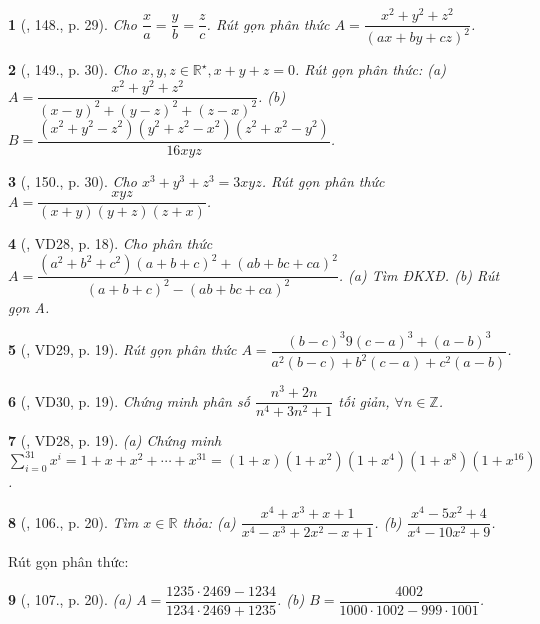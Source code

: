 \documentclass{article}
\newtheorem{baitoan}{}
\begin{document}
\begin{baitoan}[\cite{Tuyen_Toan_8}, 148., p. 29]
	Cho $\dfrac{x}{a} = \dfrac{y}{b} = \dfrac{z}{c}$. Rút gọn phân thức $A = \dfrac{x^2 + y^2 + z^2}{(ax + by + cz)^2}$.
\end{baitoan}

\begin{baitoan}[\cite{Tuyen_Toan_8}, 149., p. 30]
	Cho $x,y,z\in\mathbb{R}^\star,x + y + z = 0$. Rút gọn phân thức: (a) $A = \dfrac{x^2 + y^2 + z^2}{(x - y)^2 + (y - z)^2 + (z - x)^2}$. (b) $B = \dfrac{(x^2 + y^2 - z^2)(y^2 + z^2 - x^2)(z^2 + x^2 - y^2)}{16xyz}$.	
\end{baitoan}

\begin{baitoan}[\cite{Tuyen_Toan_8}, 150., p. 30]
	Cho $x^3 + y^3 + z^3 = 3xyz$. Rút gọn phân thức $A = \dfrac{xyz}{(x + y)(y + z)(z + x)}$.
\end{baitoan}

\begin{baitoan}[\cite{Binh_Toan_8_tap_1}, VD28, p. 18]
	Cho phân thức $A = \dfrac{(a^2 + b^2 + c^2)(a + b + c)^2 + (ab + bc + ca)^2}{(a + b + c)^2 - (ab + bc + ca)^2}$. (a) Tìm {\rm ĐKXĐ}. (b) Rút gọn A.
\end{baitoan}

\begin{baitoan}[\cite{Binh_Toan_8_tap_1}, VD29, p. 19]
	Rút gọn phân thức $A = \dfrac{(b - c)^3 9 (c - a)^3 + (a - b)^3}{a^2(b - c) + b^2(c - a) + c^2(a - b)}$.
\end{baitoan}

\begin{baitoan}[\cite{Binh_Toan_8_tap_1}, VD30, p. 19]
	Chứng minh phân số $\dfrac{n^3 + 2n}{n^4 + 3n^2 + 1}$ tối giản, $\forall n\in\mathbb{Z}$.
\end{baitoan}

\begin{baitoan}[\cite{Binh_Toan_8_tap_1}, VD28, p. 19]
	(a) Chứng minh $\sum_{i=0}^{31} x^i = 1 + x + x^2 + \cdots + x^{31} = (1 + x)(1 + x^2)(1 + x^4)(1 + x^8)(1 + x^{16})$.
\end{baitoan}

\begin{baitoan}[\cite{Binh_Toan_8_tap_1}, 106., p. 20]
	Tìm $x\in\mathbb{R}$ thỏa: (a) $\dfrac{x^4 + x^3 + x + 1}{x^4 - x^3 + 2x^2 - x + 1}$. (b) $\dfrac{x^4 - 5x^2 + 4}{x^4 - 10x^2 + 9}$.
\end{baitoan}
Rút gọn phân thức:

\begin{baitoan}[\cite{Binh_Toan_8_tap_1}, 107., p. 20]
	(a) $A = \dfrac{1235\cdot2469 - 1234}{1234\cdot2469 + 1235}$. (b) $B = \dfrac{4002}{1000\cdot1002 - 999\cdot1001}$.
\end{baitoan}
\end{document}
